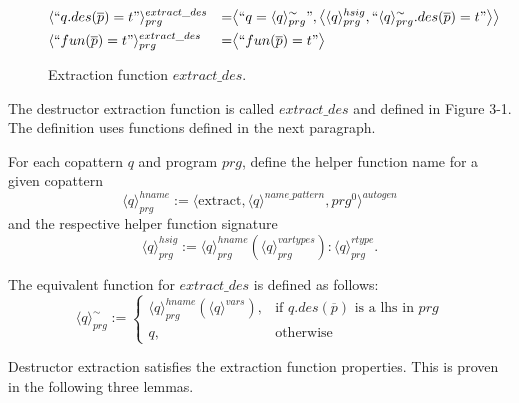 \begin{figure}
\vspace{2.4in}
\begin{alignat*}{3}
& \langle `` q.des(\overline{p}) = t " \rangle^{extract\_des}_{prg} &= &\big\langle `` q =  \langle q \rangle^{\sim}_{prg} ", \big\langle \langle q \rangle^{hsig}_{prg}, `` \langle q \rangle^{\sim}_{prg}.des(\overline{p}) = t  " \big\rangle \big\rangle \span\span \\
& \langle `` fun(\overline{p}) = t " \rangle^{extract\_des}_{prg} &= &\big\langle `` fun(\overline{p}) = t " \big\rangle \span\span
\end{alignat*}
\caption{Extraction function $extract\_des$.}
\end{figure}

The destructor extraction function is called $extract\_des$ and defined in Figure 3-1. The definition uses functions defined in the next paragraph.

For each copattern $q$ and program $prg$, define the helper function name for a given copattern
\begin{equation*}
\langle q \rangle^{hname}_{prg} := \langle \textrm{extract}, \langle q \rangle^{name\_pattern}, prg^0 \rangle^{autogen}
\end{equation*}
and the respective helper function signature
\begin{equation*}
\langle q \rangle^{hsig}_{prg} := \langle q \rangle^{hname}_{prg}(\langle q \rangle^{vartypes}_{prg}): \langle q \rangle^{rtype}_{prg}.
\end{equation*}

The equivalent function for $extract\_des$ is defined as follows:
\[
    \langle q \rangle^{\sim}_{prg} :=
\begin{cases}
    \langle q \rangle^{hname}_{prg}(\langle q \rangle^{vars}),& \text{if $q.des(\overline{p})$ is a lhs in $prg$} \\
    q,                                                                                      & \text{otherwise}
\end{cases}
\]

Destructor extraction satisfies the extraction function properties. This is proven in the following three lemmas.

